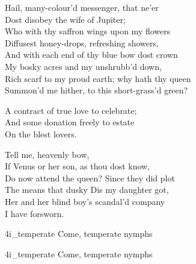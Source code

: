 
\begin{verse_speech}[Ceres] 
Hail, many-colour'd messenger, that ne'er\\
Dost disobey the wife of Jupiter;\\
Who with thy saffron wings upon my flowers\\
Diffusest honey-drops, refreshing showers,\\
And with each end of thy blue bow dost crown\\
My bosky acres and my unshrubb'd down,\\
Rich scarf to my proud earth; why hath thy queen\\
Summon'd me hither, to this short-grass'd green?
\end{verse_speech}


\begin{verse_speech}[Iris] 
A contract of true love to celebrate;\\
And some donation freely to estate\\
On the blest lovers.
\end{verse_speech}

\begin{verse_speech}[Ceres] 
Tell me, heavenly bow,\\
If Venus or her son, as thou dost know,\\
Do now attend the queen? Since they did plot\\
The means that dusky Dis my daughter got,\\
Her and her blind boy's scandal'd company\\
I have forsworn.
\end{verse_speech}


\begin{pictures} %
	\begin{letter}
		\begin{colorbigpic}
			[1.1]
			{4i_temperate}
			{Come, temperate nymphs}
		\end{colorbigpic}
	\end{letter}
	\begin{a4}
		\begin{colorbigpic}
			[1]
			{4i_temperate}
			{Come, temperate nymphs}
		\end{colorbigpic}
	\end{a4}
\end{pictures}


